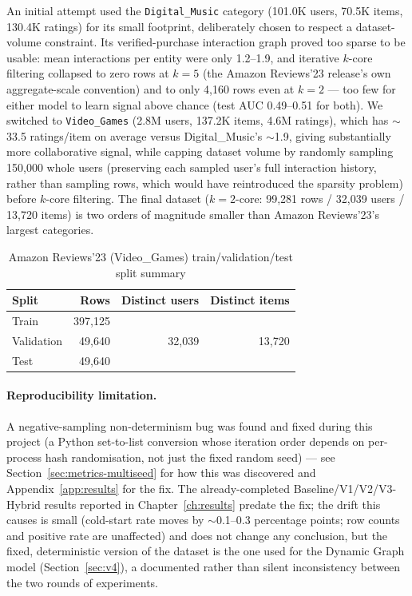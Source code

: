 An initial attempt used the \texttt{Digital\_Music} category (101.0K users, 70.5K items, 130.4K ratings) for its small footprint, deliberately chosen to respect a dataset-volume constraint. Its verified-purchase interaction graph proved too sparse to be usable: mean interactions per entity were only 1.2--1.9, and iterative $k$-core filtering collapsed to zero rows at $k=5$ (the Amazon Reviews'23 release's own aggregate-scale convention) and to only 4{,}160 rows even at $k=2$ --- too few for either model to learn signal above chance (test AUC 0.49--0.51 for both). We switched to \texttt{Video\_Games} (2.8M users, 137.2K items, 4.6M ratings), which has $\sim$33.5 ratings/item on average versus Digital\_Music's $\sim$1.9, giving substantially more collaborative signal, while capping dataset volume by randomly sampling 150{,}000 whole users (preserving each sampled user's full interaction history, rather than sampling rows, which would have reintroduced the sparsity problem) before $k$-core filtering. The final dataset ($k=2$-core: 99{,}281 rows / 32{,}039 users / 13{,}720 items) is two orders of magnitude smaller than Amazon Reviews'23's largest categories.

\begin{table}[h]
\centering
\caption{Amazon Reviews'23 (Video\_Games) train/validation/test split summary}
\label{tab:split-summary-amazon}
\begin{tabular}{lrrr}
\toprule
Split & Rows & Distinct users & Distinct items \\
\midrule
Train       & 397{,}125 & \multirow{3}{*}{32{,}039} & \multirow{3}{*}{13{,}720} \\
Validation  & 49{,}640  & & \\
Test        & 49{,}640  & & \\
\bottomrule
\end{tabular}
\end{table}

\paragraph{Reproducibility limitation.} A negative-sampling non-determinism bug was found and fixed during this project (a Python set-to-list conversion whose iteration order depends on per-process hash randomisation, not just the fixed random seed) --- see Section~\ref{sec:metrics-multiseed} for how this was discovered and Appendix~\ref{app:results} for the fix. The already-completed Baseline/V1/V2/V3-Hybrid results reported in Chapter~\ref{ch:results} predate the fix; the drift this causes is small (cold-start rate moves by $\sim$0.1--0.3 percentage points; row counts and positive rate are unaffected) and does not change any conclusion, but the fixed, deterministic version of the dataset is the one used for the Dynamic Graph model (Section~\ref{sec:v4}), a documented rather than silent inconsistency between the two rounds of experiments.

